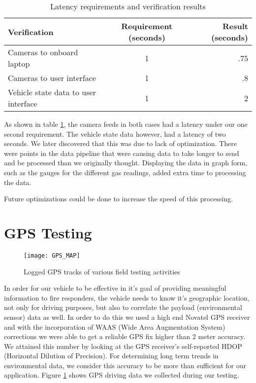 \begin{table}[ht]
    \centering
    \begin{tabular}{ l | c | r }
      Verification & Requirement (seconds) & Result (seconds) \\ \hline
      Cameras to onboard laptop & 1 & .75 \\
      Cameras to user interface & 1 & .8 \\
      Vehicle state data to user interface & 1 & 2 \\
    \end{tabular}
    \caption{Latency requirements and verification results}
    \label{table:latency_verification}
\end{table}

As shown in table \ref{table:latency_verification}, the camera feeds in both cases had a latency under our one second requirement.  The vehicle state data however, had a latency of two seconds.  We later discovered that this was due to lack of optimization.  There were points in the data pipeline that were causing data to take longer to send and be processed than we originally thought.  Displaying the data in graph form, such as the gauges for the different gas readings, added extra time to processing the data.

Future optimizations could be done to increase the speed of this processing.

\section{GPS Testing}
\begin{figure}[h!]
	\centerline{\texttt{[image: GPS\_MAP]}}
	\caption[]{Logged GPS tracks of various field testing activities}
	\label{fig:GPSMAP}
\end{figure}

In order for our vehicle to be effective in it's goal of providing meaningful information to fire responders, the vehicle needs to know it's geographic location, not only for driving purposes, but also to correlate the payload (environmental sensor) data as well. In order to do this we used a high end Novatel GPS receiver and with the incorporation of WAAS (Wide Area Augmentation System) corrections we were able to get a reliable GPS fix higher than 2 meter accuracy. We attained this number by looking at the GPS receiver's self-reported HDOP (Horizontal Dilution of Precision). For determining long term trends in environmental data, we consider this accuracy to be more than sufficient for our application. Figure \ref{fig:GPSMAP} shows GPS driving data we collected during our testing. 


